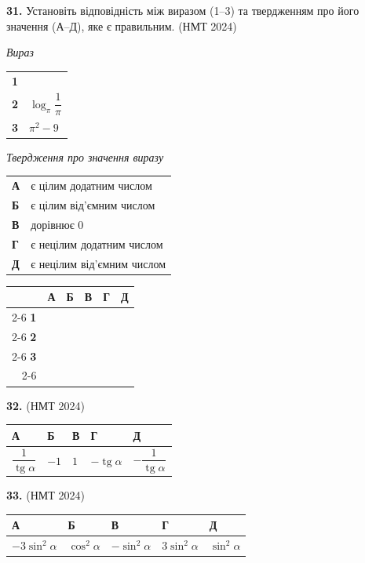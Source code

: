 \documentclass[14pt]{extarticle}
\newcommand{\answerTableTall}[5]{
\begin{center}
\begin{tabular}{|*{5}{>{\centering\arraybackslash}m{2.8cm}|}}
\hline
\rule[-0.3cm]{0pt}{0.8cm}\textbf{А} & \textbf{Б} & \textbf{В} & \textbf{Г} & \textbf{Д} \\
\hline
\rule[-0.9cm]{0pt}{2.0cm}#1 & 
\rule[-0.9cm]{0pt}{2.0cm}#2 & 
\rule[-0.9cm]{0pt}{2.0cm}#3 & 
\rule[-0.9cm]{0pt}{2.0cm}#4 & 
\rule[-0.9cm]{0pt}{2.0cm}#5 \\
\hline
\end{tabular}
\end{center}
}
\newcommand{\answerGrid}{
    \begingroup
    \renewcommand{\arraystretch}{1.3} 
    \setlength{\tabcolsep}{7pt} 
    \begin{tabular}{r|c|c|c|c|c|}
         \multicolumn{1}{c}{} & \multicolumn{1}{c}{\textbf{А}} & \multicolumn{1}{c}{\textbf{Б}} & \multicolumn{1}{c}{\textbf{В}} & \multicolumn{1}{c}{\textbf{Г}} & \multicolumn{1}{c}{\textbf{Д}} \\ \cline{2-6}
         \textbf{1} & & & & & \\ \cline{2-6}
         \textbf{2} & & & & & \\ \cline{2-6}
         \textbf{3} & & & & & \\ \cline{2-6}
    \end{tabular}
    \endgroup
}
\newcommand{\matchingLayout}[3]{
    \noindent
    \begin{minipage}[t]{0.40\textwidth}
       
        #1
    \end{minipage}%
    \hfill
    \begin{minipage}[t]{0.28\textwidth}
        
        #2
    \end{minipage}%
    \hfill
    \begin{minipage}[t]{0.30\textwidth}
        \vspace{0pt} %
        \begin{flushright}
        #3
        \end{flushright}
    \end{minipage}
}
\newcommand{\nmtyear}[1]{\hfill{\small\color{yearcolor}(НМТ #1)}}
\begin{document}
\vspace{0.7cm}

\noindent\textbf{31.} Установіть відповідність між виразом (1--3) та твердженням про його значення (А--Д), яке є правильним. \nmtyear{2024}

\vspace{0.3cm}

\matchingLayout{
    \textit{Вираз} \par \vspace{0.2cm}
    \begin{tabular}{@{}p{0.5cm} l@{}}
    \textbf{1} & \trigStyle{$\cos 2\pi$} \\[0.4cm]
    \textbf{2} & $\log_{\pi} \dfrac{1}{\pi}$ \\[0.6cm]
    \textbf{3} & $\pi^2 - 9$ \\
    \end{tabular}
}{
    \textit{Твердження про значення виразу} \par \vspace{0.2cm}
    \begin{tabular}{@{}p{0.3cm} p{5cm}@{}}
    \textbf{А} & є цілим додатним числом \\[0.2cm]
    \textbf{Б} & є цілим від'ємним числом \\[0.2cm]
    \textbf{В} & дорівнює 0 \\[0.2cm]
    \textbf{Г} & є нецілим додатним числом \\[0.2cm]
    \textbf{Д} & є нецілим від'ємним числом \\
    \end{tabular}
}{
    \answerGrid
}

\vspace{0.7cm}

\noindent\textbf{32.}  \nmtyear{2024}

\vspace{0.3cm}
\answerTableTall{$\dfrac{1}{\operatorname{tg} \alpha}$}{$-1$}{$1$}{$-\operatorname{tg} \alpha$}{$-\dfrac{1}{\operatorname{tg} \alpha}$}

\vspace{0.7cm}

\noindent\textbf{33.}  \nmtyear{2024}

\vspace{0.3cm}
\answerTableTall{$-3\sin^2 \alpha$}{$\cos^2 \alpha$}{$-\sin^2 \alpha$}{$3\sin^2 \alpha$}{$\sin^2 \alpha$}
\end{document}
